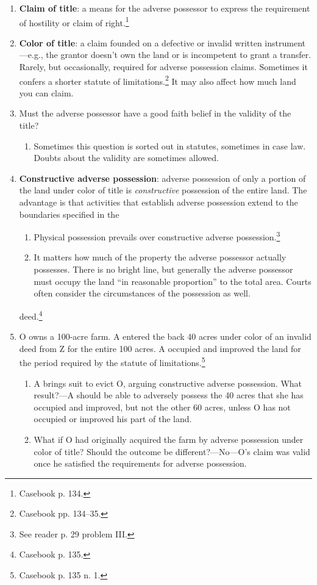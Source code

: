 \begin{enumerate}
    \item \textbf{Claim of title}: a means for the adverse possessor to 
    express the requirement of hostility or claim of right.\footnote{Casebook 
    p. 134.}
    \item \textbf{Color of title}: a claim founded on a defective or invalid 
    written instrument---e.g., the grantor doesn't own the land or is 
    incompetent to grant a transfer. Rarely, but occasionally, required for 
    adverse possession claims. Sometimes it confers a shorter statute of 
    limitations.\footnote{Casebook pp. 134--35.} It may also affect how much 
    land you can claim.
    \item Must the adverse possessor have a good faith belief in the validity 
    of the title?
    \begin{enumerate}
        \item Sometimes this question is sorted out in statutes, sometimes in 
        case law. Doubts about the validity are sometimes allowed.
    \end{enumerate}
    \item \textbf{Constructive adverse possession}: adverse possession of only 
    a portion of the land under color of title is \emph{constructive} 
    possession of the entire land. The advantage is that activities that 
    establish adverse possession extend to the boundaries specified in the 
    \begin{enumerate}
        \item Physical possession prevails over constructive adverse 
        possession.\footnote{See reader p. 29 problem III.}
        \item It matters how much of the property the adverse possessor 
        actually possesses. There is no bright line, but generally the adverse 
        possessor must occupy the land ``in reasonable proportion'' to the 
        total area. Courts often consider the circumstances of the possession 
        as well.
    \end{enumerate}
    deed.\footnote{Casebook p. 135.}
    \item O owns a 100-acre farm. A entered the back 40 acres under color of 
    an invalid deed from Z for the entire 100 acres. A occupied and improved 
    the land for the period required by the statute of 
    limitations.\footnote{Casebook p. 135 n. 1.}
    \begin{enumerate}
        \item A brings suit to evict O, arguing constructive adverse 
        possession. What result?---A should be able to adversely possess the 
        40 acres that she has occupied and improved, but not the other 
        60 acres, unless O has not occupied or improved his part of the land.
        \item What if O had originally acquired the farm by adverse possession 
        under color of title? Should the outcome be different?---No---O's 
        claim was valid once he satisfied the requirements for adverse 
        possession.
    \end{enumerate}
\end{enumerate}


